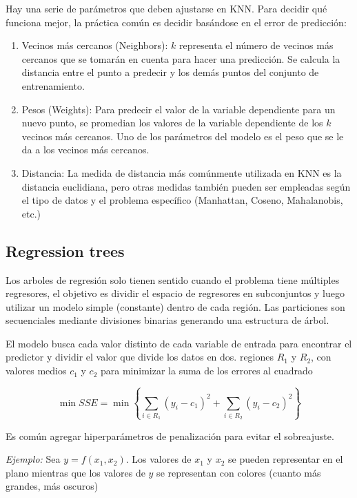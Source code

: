 \documentclass[
]{book}
\begin{document}
Hay una serie de parámetros que deben ajustarse en KNN. Para decidir qué
funciona mejor, la práctica común es decidir basándose en el error de
predicción:

\begin{enumerate}
\def\labelenumi{\arabic{enumi}.}
\item
  Vecinos más cercanos (Neighbors): \(k\) representa el número de
  vecinos más cercanos que se tomarán en cuenta para hacer una
  predicción. Se calcula la distancia entre el punto a predecir y los
  demás puntos del conjunto de entrenamiento.
\item
  Pesos (Weights): Para predecir el valor de la variable dependiente
  para un nuevo punto, se promedian los valores de la variable
  dependiente de los \(k\) vecinos más cercanos. Uno de los parámetros
  del modelo es el peso que se le da a los vecinos más cercanos.
\item
  Distancia: La medida de distancia más comúnmente utilizada en KNN es
  la distancia euclidiana, pero otras medidas también pueden ser
  empleadas según el tipo de datos y el problema específico
  (Manhattan, Coseno, Mahalanobis, etc.)
\end{enumerate}

\hypertarget{regression-trees-1}{%
\subsection{Regression trees}\label{regression-trees-1}}

Los arboles de regresión solo tienen sentido cuando el problema tiene
múltiples regresores, el objetivo es dividir el espacio de regresores en
subconjuntos y luego utilizar un modelo simple (constante) dentro de
cada región. Las particiones son secuenciales mediante divisiones
binarias generando una estructura de árbol.

El modelo busca cada valor distinto de cada variable de entrada para
encontrar el predictor y dividir el valor que divide los datos en dos.
regiones \(R_1\) y \(R_2\), con valores medios \(c_1\) y \(c_2\) para minimizar
la suma de los errores al cuadrado

\[\min SSE = \min \left\{ \sum_{i \in R_1}(y_i - c_1)^2 + \sum_{i \in R_2} (y_i - c_2)^2 \right\}\]

Es común agregar hiperparámetros de penalización para evitar el
sobreajuste.

\emph{Ejemplo:} Sea \(y = f(x_1, x_2)\). Los valores de \(x_1\) y \(x_2\) se pueden
representar en el plano mientras que los valores de \(y\) se representan
con colores (cuanto más grandes, más oscuros)
\end{document}
